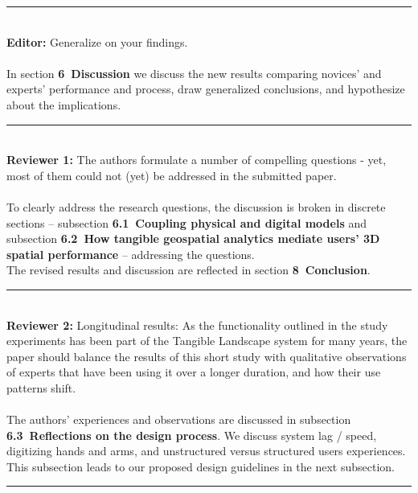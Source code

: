 \documentclass[prodmode,acmtochi]{acmsmall} %
\newcommand{\doublerule}[1][.4pt]{%
  \noindent
  \makebox[0pt][l]{\rule[.7ex]{\linewidth}{#1}}%
  \rule[.3ex]{\linewidth}{#1}}
\begin{document}
\doublerule \\

\textbf{Editor:} Generalize on your findings.\\

\hrulefill \\

In section \textbf{6~Discussion}
we discuss the new results 
comparing novices' and experts' performance and process, 
draw generalized conclusions, and 
hypothesize about the implications. \\

\doublerule \\

\textbf{Reviewer 1:} The authors formulate a number of compelling questions - yet, most of them could not (yet) be addressed in the submitted paper.\\

\hrulefill \\

To clearly address the research questions, the discussion
is broken in discrete sections -- 
subsection \textbf{6.1~Coupling physical and digital models}
and 
subsection \textbf{6.2~How tangible geospatial analytics mediate users’ 3D spatial performance} 
-- addressing the questions. \\

The revised results and discussion are reflected in section \textbf{8~Conclusion}.\\

\doublerule \\

\textbf{Reviewer 2:} Longitudinal results: As the functionality outlined in the study experiments has been part of the Tangible Landscape system for many years, the paper should balance the results of this short study with qualitative observations of experts that have been using it over a longer duration, and how their use patterns shift.\\

\hrulefill \\

The authors' experiences and observations are discussed in 
subsection \textbf{6.3~Reflections on the design process}.
We discuss system lag / speed, digitizing hands and arms,
and unstructured versus structured users experiences. 
This subsection leads to our proposed design guidelines 
in the next subsection.\\

\doublerule \\
\end{document}
